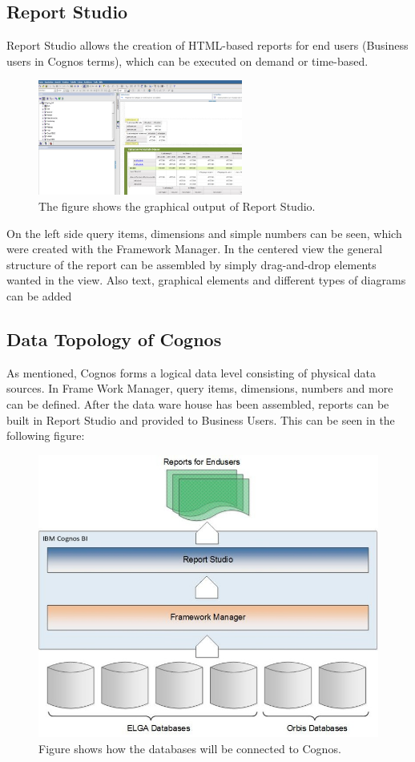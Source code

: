 \documentclass[a4paper]{article}
\begin{document}
	\subsection{Report Studio}
	Report Studio allows the creation of HTML-based reports for end users
	(Business users in Cognos terms), which can be executed on demand or
	time-based.
	\begin{figure}[!ht]
		  \centering
		      \includegraphics[width=0.6\textwidth]{ReportStudio_2}
		  \caption{The figure shows the graphical output of Report Studio.}
	\end{figure}
	On the left side query items, dimensions and simple numbers can be seen, which
	were created with the Framework Manager. In the centered view the general
	structure of the report can be assembled by simply drag-and-drop
	elements wanted in the view. Also text, graphical elements and different types
	of diagrams can be added
	\subsection{Data Topology of Cognos}
	As mentioned, Cognos forms a logical data level consisting of
	physical data sources. In Frame Work Manager, query items, dimensions, numbers
	and more can be defined. After the data ware house has been assembled, reports
	can be built in Report Studio and provided to Business Users. This can be seen
	in the following figure:
	\begin{figure}[!ht]
		  \centering
		      \includegraphics[width=1.0\textwidth]{AllDBtoCognos}
		  \caption{Figure shows how the databases will be connected to Cognos.}
	\end{figure}
	
\end{document}
